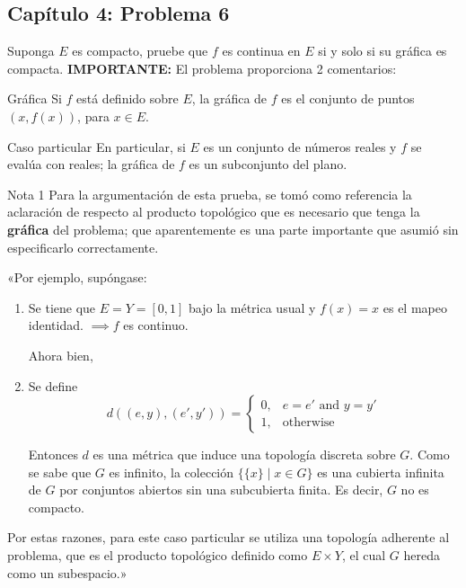 \subsection{Capítulo 4: Problema 6}

Suponga $E$ es compacto, pruebe que $f$ es continua en $E$ si y solo si su gráfica es compacta. 
\newline 
\textbf{IMPORTANTE:} El problema proporciona 2 comentarios:
\begin{noter}{Gráfica}
Si $f$ está definido sobre $E$, la gráfica de $f$ es el conjunto de puntos $(x,f(x))$, para $x\in E$.
\end{noter}
\begin{noter}{Caso particular}
En particular, si $E$ es un conjunto de números reales y $f$ se evalúa con reales; la gráfica de $f$ es un subconjunto del plano.
\end{noter}
\begin{noter}{Nota 1}
Para la argumentación de esta prueba, se tomó como referencia la aclaración de \cite{3534792} respecto al producto topológico que es necesario que tenga la \textbf{gráfica} del problema; que aparentemente es una parte importante que \cite{rudin1976principles} asumió sin especificarlo correctamente.

«Por ejemplo, supóngase: 
\begin{enumerate}
    \item Se tiene que $E=Y=[0,1]$ bajo la métrica usual y $f(x)=x$ es el mapeo identidad. $\implies f$ es continuo.  \newline\newline
    
    Ahora bien,
    
    \item Se define 
    $$d((e,y),(e',y')) = \begin{cases} 0, & e = e'\text{ and }y = y'\\1, & \text{otherwise}\end{cases}$$
    
    
    Entonces $d$ es una métrica que induce una topología discreta sobre $G$. Como se sabe que $G$ es infinito, la colección $\big\{\{x\}\mid x \in G\big\}$ es una cubierta infinita de $G$ por conjuntos abiertos sin una subcubierta finita. Es decir, $G$ no es compacto.
\end{enumerate}
Por estas razones, para este caso particular se utiliza una topología adherente al problema, que es el producto topológico definido como  $E\times Y$, el cual $G$ hereda como un subespacio.»

\end{noter}

